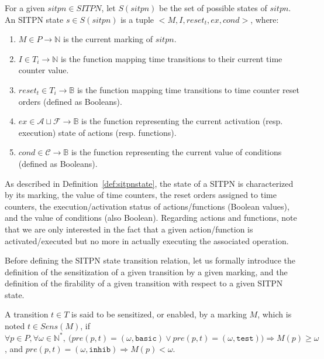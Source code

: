 \begin{definition}
  \label{def:sitpnstate}
  For a given $sitpn\in{}SITPN$, let $S(sitpn)$ be the set of possible
  states of $sitpn$. An SITPN state $s\in{}S(sitpn)$ is a tuple
  ${<}M,I,reset_t,ex,cond{>}$, where:
  \begin{enumerate}
  \item $M\in{}P\rightarrow\mathbb{N}$ is the current marking of
    $sitpn$.
  \item\label{item:sitpn-state-tc} $I\in{}T_i{}\rightarrow\mathbb{N}$
    is the function mapping time transitions to their current time
    counter value.
  \item\label{item:sitpn-state-rst}
    $reset_t\in{}T_i\rightarrow\mathbb{B}$ is the function mapping
    time transitions to time counter reset orders (defined as
    Booleans).
  \item $ex\in{}\mathcal{A}\sqcup\mathcal{F}\rightarrow\mathbb{B}$ is
    the function representing the current activation (resp. execution)
    state of actions (resp. functions).
  \item $cond\in\mathcal{C}\rightarrow\mathbb{B}$ is the function representing the
    current value of conditions (defined as Booleans).
  \end{enumerate}
\end{definition}

As described in Definition~\ref{def:sitpnstate}, the state of a SITPN
is characterized by its marking, the value of time counters, the reset
orders assigned to time counters, the execution/activation status of
actions/functions (Boolean values), and the value of conditions (also
Boolean). Regarding actions and functions, note that we are only
interested in the fact that a given action/function is
activated/executed but no more in actually executing the associated
operation.

Before defining the SITPN state transition relation, let us formally
introduce the definition of the sensitization of a given transition by
a given marking, and the definition of the firability of a given
transition with respect to a given SITPN state.

\begin{definition}[Sensitization]
  \label{def:sens}
  A transition $t\in{}T$ is said to be sensitized, or enabled, by a
  marking $M$, which is noted $t\in{}Sens(M)$, if
  $\forall{}p\in{}P,\forall\omega\in\mathbb{N}^{*},~\big(pre(p,t)=(\omega,\mathtt{basic})\vee{}pre(p,t)=(\omega,\mathtt{test})\big)\Rightarrow{}M(p)\ge{}\omega$,
  and $pre(p,t)=(\omega,\mathtt{inhib})\Rightarrow{}M(p)<{}\omega$.
\end{definition}

